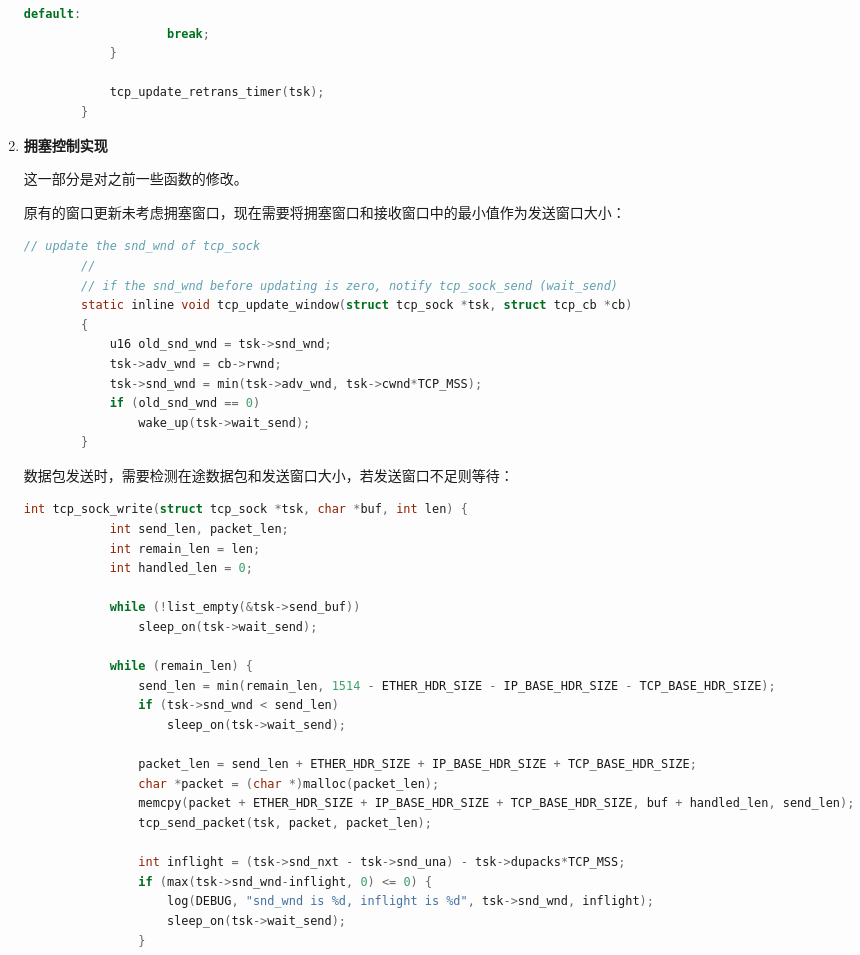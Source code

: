 \documentclass[UTF8]{report}
\newcommand{\tbf}[1]{\textbf{#1}}
\begin{document}
\begin{enumerate}
\begin{lstlisting}[language=C]
                default:
                    break;
            }
        
            tcp_update_retrans_timer(tsk);
        }
    \end{lstlisting}
    
    \item \tbf{拥塞控制实现}
    
    这一部分是对之前一些函数的修改。

    原有的窗口更新未考虑拥塞窗口，现在需要将拥塞窗口和接收窗口中的最小值作为发送窗口大小：

    \begin{lstlisting}[language=C]
        // update the snd_wnd of tcp_sock
        //
        // if the snd_wnd before updating is zero, notify tcp_sock_send (wait_send)
        static inline void tcp_update_window(struct tcp_sock *tsk, struct tcp_cb *cb)
        {
            u16 old_snd_wnd = tsk->snd_wnd;
            tsk->adv_wnd = cb->rwnd;
            tsk->snd_wnd = min(tsk->adv_wnd, tsk->cwnd*TCP_MSS);
            if (old_snd_wnd == 0)
                wake_up(tsk->wait_send);
        }
    \end{lstlisting}
    
    数据包发送时，需要检测在途数据包和发送窗口大小，若发送窗口不足则等待：

    \begin{lstlisting}[language=C]
        int tcp_sock_write(struct tcp_sock *tsk, char *buf, int len) {
            int send_len, packet_len;
            int remain_len = len;
            int handled_len = 0;
        
            while (!list_empty(&tsk->send_buf))
                sleep_on(tsk->wait_send);
        
            while (remain_len) {
                send_len = min(remain_len, 1514 - ETHER_HDR_SIZE - IP_BASE_HDR_SIZE - TCP_BASE_HDR_SIZE);
                if (tsk->snd_wnd < send_len)
                    sleep_on(tsk->wait_send);
        
                packet_len = send_len + ETHER_HDR_SIZE + IP_BASE_HDR_SIZE + TCP_BASE_HDR_SIZE;
                char *packet = (char *)malloc(packet_len);
                memcpy(packet + ETHER_HDR_SIZE + IP_BASE_HDR_SIZE + TCP_BASE_HDR_SIZE, buf + handled_len, send_len);
                tcp_send_packet(tsk, packet, packet_len);
        
                int inflight = (tsk->snd_nxt - tsk->snd_una) - tsk->dupacks*TCP_MSS;
                if (max(tsk->snd_wnd-inflight, 0) <= 0) {
                    log(DEBUG, "snd_wnd is %d, inflight is %d", tsk->snd_wnd, inflight);
                    sleep_on(tsk->wait_send);
                }
        

\end{lstlisting}
\end{enumerate}
\end{document}
